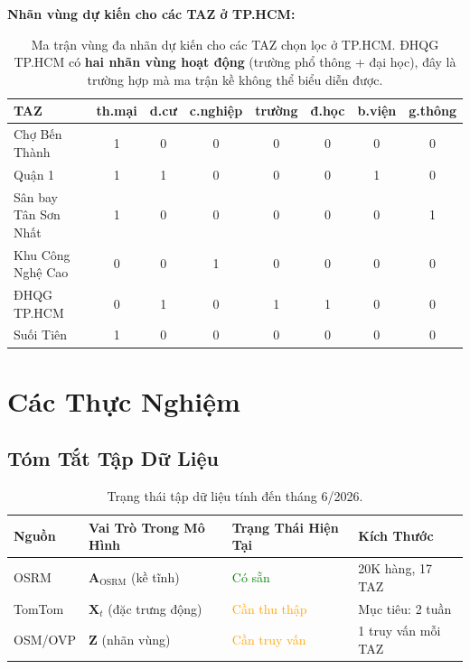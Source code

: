 \documentclass[12pt,a4paper]{article}
\begin{document}
\textbf{Nhãn vùng dự kiến cho các TAZ ở TP.HCM:}

\begin{table}[h]
\centering
\small
\begin{tabular}{lccccccc}
\toprule
\textbf{TAZ} & \textbf{th.mại} & \textbf{d.cư} & \textbf{c.nghiệp} & \textbf{trường} & \textbf{đ.học} & \textbf{b.viện} & \textbf{g.thông} \\
\midrule
Chợ Bến Thành       & 1 & 0 & 0 & 0 & 0 & 0 & 0 \\
Quận 1              & 1 & 1 & 0 & 0 & 0 & 1 & 0 \\
Sân bay Tân Sơn Nhất& 1 & 0 & 0 & 0 & 0 & 0 & 1 \\
Khu Công Nghệ Cao   & 0 & 0 & 1 & 0 & 0 & 0 & 0 \\
ĐHQG TP.HCM         & 0 & 1 & 0 & 1 & 1 & 0 & 0 \\
Suối Tiên           & 1 & 0 & 0 & 0 & 0 & 0 & 0 \\
\bottomrule
\end{tabular}
\caption{Ma trận vùng đa nhãn dự kiến cho các TAZ chọn lọc ở TP.HCM.
         ĐHQG TP.HCM có \textbf{hai nhãn vùng hoạt động} (trường phổ thông + đại học),
         đây là trường hợp mà ma trận kề không thể biểu diễn được.}
\end{table}

\section{Các Thực Nghiệm}

\subsection{Tóm Tắt Tập Dữ Liệu}

\begin{table}[h]
\centering
\begin{tabular}{llll}
\toprule
\textbf{Nguồn} & \textbf{Vai Trò Trong Mô Hình} & \textbf{Trạng Thái Hiện Tại} & \textbf{Kích Thước} \\
\midrule
OSRM & $\mathbf{A}_{\text{OSRM}}$ (kề tĩnh) & \textcolor{green}{Có sẵn} & 20K hàng, 17 TAZ \\
TomTom & $\mathbf{X}_t$ (đặc trưng động) & \textcolor{orange}{Cần thu thập} & Mục tiêu: 2 tuần \\
OSM/OVP & $\mathbf{Z}$ (nhãn vùng) & \textcolor{orange}{Cần truy vấn} & 1 truy vấn mỗi TAZ \\
\bottomrule
\end{tabular}
\caption{Trạng thái tập dữ liệu tính đến tháng 6/2026.}
\end{table}
\end{document}
